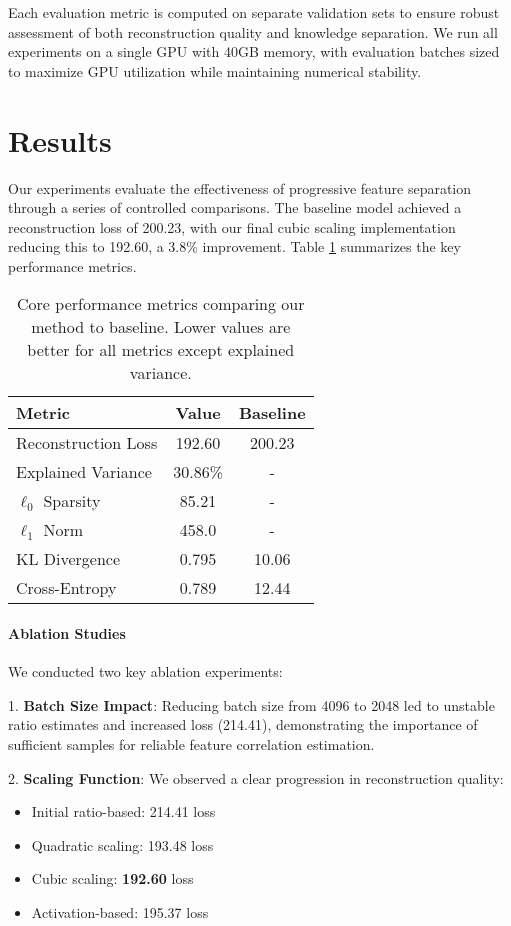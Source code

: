 \documentclass{article} %
\begin{document}
Each evaluation metric is computed on separate validation sets to ensure robust assessment of both reconstruction quality and knowledge separation. We run all experiments on a single GPU with 40GB memory, with evaluation batches sized to maximize GPU utilization while maintaining numerical stability.

\section{Results}
\label{sec:results}

Our experiments evaluate the effectiveness of progressive feature separation through a series of controlled comparisons. The baseline model achieved a reconstruction loss of 200.23, with our final cubic scaling implementation reducing this to 192.60, a 3.8\% improvement. Table \ref{tab:core_metrics} summarizes the key performance metrics.

\begin{table}[h]
\centering
\begin{tabular}{lcc}
\toprule
Metric & Value & Baseline \\
\midrule
Reconstruction Loss & 192.60 & 200.23 \\
Explained Variance & 30.86\% & - \\
$\ell_0$ Sparsity & 85.21 & - \\
$\ell_1$ Norm & 458.0 & - \\
KL Divergence & 0.795 & 10.06 \\
Cross-Entropy & 0.789 & 12.44 \\
\bottomrule
\end{tabular}
\caption{Core performance metrics comparing our method to baseline. Lower values are better for all metrics except explained variance.}
\label{tab:core_metrics}
\end{table}

\paragraph{Ablation Studies} We conducted two key ablation experiments:

1. \textbf{Batch Size Impact}: Reducing batch size from 4096 to 2048 led to unstable ratio estimates and increased loss (214.41), demonstrating the importance of sufficient samples for reliable feature correlation estimation.

2. \textbf{Scaling Function}: We observed a clear progression in reconstruction quality:
\begin{itemize}
    \item Initial ratio-based: 214.41 loss
    \item Quadratic scaling: 193.48 loss
    \item Cubic scaling: \textbf{192.60} loss
    \item Activation-based: 195.37 loss
\end{itemize}
\end{document}
